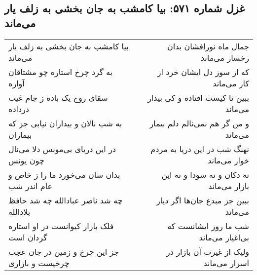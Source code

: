 \begin{center}
\section*{غزل شماره ۵۷۱: بیا کامشب به جان بخشی به زلف یار می‌ماند}
\label{sec:0571}
\begin{longtable}{l p{0.5cm} r}
بیا کامشب به جان بخشی به زلف یار می‌ماند
&&
جمال ماه نورافشان بدان رخسار می‌ماند
\\
به گرد چرخ استاره چو مشتاقان آواره
&&
که از سوز دل ایشان خرد از کار می‌ماند
\\
سقای روح یک باده ز جام غیب درداده
&&
ببین تا کیست افتاده و کی بیدار می‌ماند
\\
به شب نالان و بیداران نیابی جز که بیماران
&&
و من گر هم نمی‌نالم دلم بیمار می‌ماند
\\
در این دریای بی‌مونس دلا می‌نال چون یونس
&&
نهنگ شب در این دریا به مردم خوار می‌ماند
\\
بدان سان می‌خورد ما را ز خاص و عام اندر شب
&&
نه دکان و نه سودا و نه این بازار می‌ماند
\\
چه شد ناصر عبادالله چه شد حافظ بلادالله
&&
ببین جز مبدع جان‌ها اگر دیار می‌ماند
\\
فلک بازار کیوانست در او استاره گردان است
&&
شب ما روز ایشانست که بی‌اغیار می‌ماند
\\
جز این چرخ و زمین در جان عجب چرخیست و بازاری
&&
ولیک از غیرت آن بازار در اسرار می‌ماند
\\
\end{longtable}
\end{center}
